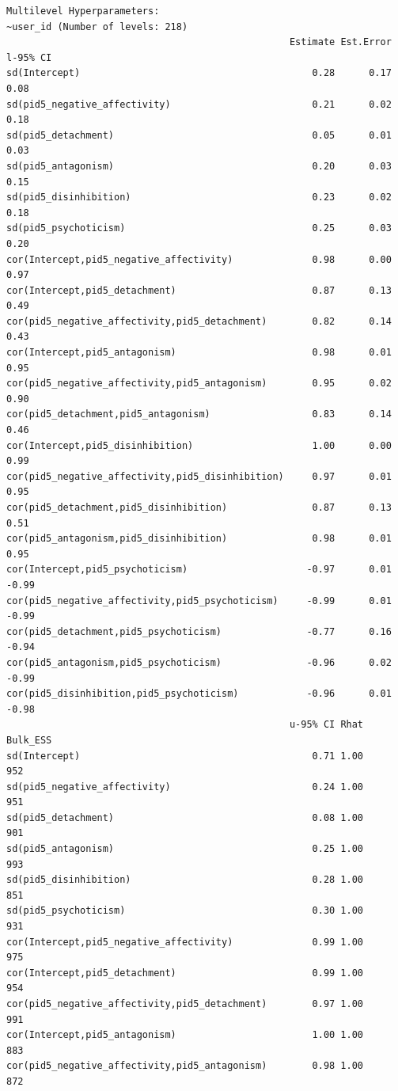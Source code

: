 \documentclass[
  11pt,
  a4paper,
  onecolumn]{article}
\begin{document}
\begin{verbatim}
Multilevel Hyperparameters:
~user_id (Number of levels: 218) 
                                                  Estimate Est.Error l-95% CI
sd(Intercept)                                         0.28      0.17     0.08
sd(pid5_negative_affectivity)                         0.21      0.02     0.18
sd(pid5_detachment)                                   0.05      0.01     0.03
sd(pid5_antagonism)                                   0.20      0.03     0.15
sd(pid5_disinhibition)                                0.23      0.02     0.18
sd(pid5_psychoticism)                                 0.25      0.03     0.20
cor(Intercept,pid5_negative_affectivity)              0.98      0.00     0.97
cor(Intercept,pid5_detachment)                        0.87      0.13     0.49
cor(pid5_negative_affectivity,pid5_detachment)        0.82      0.14     0.43
cor(Intercept,pid5_antagonism)                        0.98      0.01     0.95
cor(pid5_negative_affectivity,pid5_antagonism)        0.95      0.02     0.90
cor(pid5_detachment,pid5_antagonism)                  0.83      0.14     0.46
cor(Intercept,pid5_disinhibition)                     1.00      0.00     0.99
cor(pid5_negative_affectivity,pid5_disinhibition)     0.97      0.01     0.95
cor(pid5_detachment,pid5_disinhibition)               0.87      0.13     0.51
cor(pid5_antagonism,pid5_disinhibition)               0.98      0.01     0.95
cor(Intercept,pid5_psychoticism)                     -0.97      0.01    -0.99
cor(pid5_negative_affectivity,pid5_psychoticism)     -0.99      0.01    -0.99
cor(pid5_detachment,pid5_psychoticism)               -0.77      0.16    -0.94
cor(pid5_antagonism,pid5_psychoticism)               -0.96      0.02    -0.99
cor(pid5_disinhibition,pid5_psychoticism)            -0.96      0.01    -0.98
                                                  u-95% CI Rhat Bulk_ESS
sd(Intercept)                                         0.71 1.00      952
sd(pid5_negative_affectivity)                         0.24 1.00      951
sd(pid5_detachment)                                   0.08 1.00      901
sd(pid5_antagonism)                                   0.25 1.00      993
sd(pid5_disinhibition)                                0.28 1.00      851
sd(pid5_psychoticism)                                 0.30 1.00      931
cor(Intercept,pid5_negative_affectivity)              0.99 1.00      975
cor(Intercept,pid5_detachment)                        0.99 1.00      954
cor(pid5_negative_affectivity,pid5_detachment)        0.97 1.00      991
cor(Intercept,pid5_antagonism)                        1.00 1.00      883
cor(pid5_negative_affectivity,pid5_antagonism)        0.98 1.00      872

\end{verbatim}
\end{document}
